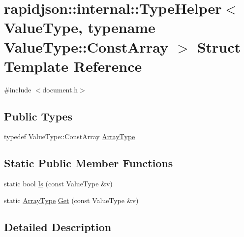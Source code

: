 \hypertarget{structrapidjson_1_1internal_1_1_type_helper_3_01_value_type_00_01typename_01_value_type_1_1_const_array_01_4}{}\section{rapidjson\+::internal\+::Type\+Helper$<$ Value\+Type, typename Value\+Type\+::Const\+Array $>$ Struct Template Reference}
\label{structrapidjson_1_1internal_1_1_type_helper_3_01_value_type_00_01typename_01_value_type_1_1_const_array_01_4}


{\ttfamily \#include $<$document.\+h$>$}

\subsection*{Public Types}
\begin{DoxyCompactItemize}
\item 
typedef Value\+Type\+::\+Const\+Array \mbox{\hyperlink{structrapidjson_1_1internal_1_1_type_helper_3_01_value_type_00_01typename_01_value_type_1_1_const_array_01_4_a34a8dd6578584c0b87c4933c610778f5}{Array\+Type}}
\end{DoxyCompactItemize}
\subsection*{Static Public Member Functions}
\begin{DoxyCompactItemize}
\item 
static bool \mbox{\hyperlink{structrapidjson_1_1internal_1_1_type_helper_3_01_value_type_00_01typename_01_value_type_1_1_const_array_01_4_a4ff292f86c9d8de0c62fd998514683c7}{Is}} (const Value\+Type \&v)
\item 
static \mbox{\hyperlink{structrapidjson_1_1internal_1_1_type_helper_3_01_value_type_00_01typename_01_value_type_1_1_const_array_01_4_a34a8dd6578584c0b87c4933c610778f5}{Array\+Type}} \mbox{\hyperlink{structrapidjson_1_1internal_1_1_type_helper_3_01_value_type_00_01typename_01_value_type_1_1_const_array_01_4_a8cf2a12170c410df6715b70affcd1edf}{Get}} (const Value\+Type \&v)
\end{DoxyCompactItemize}


\subsection{Detailed Description}
